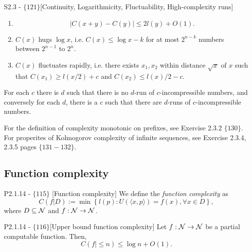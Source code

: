 \documentclass{article}
\begin{document}
\begin{flexitheorem}{S2.3 - $\{121\}$}[Continuity, Logarithmicity, Fluctuability, High-complexity runs]
    \begin{enumerate}[label=(\alph*)]
        \item
        \begin{equation}
            |C(x+y) - C(y)| \leq 2l(y) + O(1).
        \end{equation}
        \item $C(x)$ hugs $\log x$, i.e. $C(x) \leq \log x - k$ for at most $2^{n -k}$ numbers between $2^{n-1}$ to $2^n$.
        \item $C(x)$ fluctuates rapidly, i.e. there exists $x_1,x_2$ within distance $\sqrt{x}$ of $x$ such that $C(x_1) \geq l(x /2) + c$ and $C(x_2) \leq l(x)/2 - c$.
    \end{enumerate}
        \item For each $c$ there is $d$ such that there is no $d$-run of $c$-incompressible numbers, and conversely for each $d$, there is a $c$ such that there are $d$-runs of $c$-incompressible numbers.
\end{flexitheorem}

For the definition of complexity monotonic on prefixes, see Exercise 2.3.2 $\{130\}$.
For properites of Kolmogorov complexity of infinite sequences, see Exercise 2.3.4, 2.3.5 pages $\{131 - 132\}$.

\subsection{Function complexity}
\begin{flexidefinition}{P2.1.14 - $\{115\}$ }[Function complexity]
    We define the \textit{function complexity} as
\begin{equation}
    C(f|D) := \min \left\{ l(p): U(\langle x, p \rangle) = f(x), \forall x \in D \right\},
\end{equation}
where $D \subseteq \mathcal{N}$ and $f : \mathcal{N} \to \mathcal{N}$.
\end{flexidefinition}

\begin{flexilemma}{P2.1.14 - $\{116\}$}[Upper bound function complexity]
    Let $f : \mathcal{N} \to \mathcal{N}$ be a partial computable function. Then,
    \begin{equation}
        C(f|\leq n) \leq \log n + O(1).
    \end{equation}
\end{flexilemma}
\end{document}
